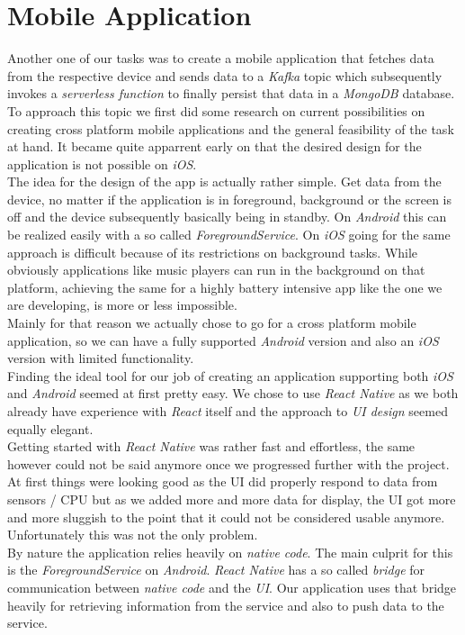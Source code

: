 \section{Mobile Application}

Another one of our tasks was to create a mobile application that fetches data from the respective device and sends data to a \textit{Kafka} topic which subsequently invokes a \textit{serverless function} to finally persist that data in a \textit{MongoDB} database. To approach this topic we first did some research on current possibilities on creating cross platform mobile applications and the general feasibility of the task at hand. It became quite apparrent early on that the desired design for the application is not possible on \textit{iOS}. \\
The idea for the design of the app is actually rather simple. Get data from the device, no matter if the application is in foreground, background or the screen is off and the device subsequently basically being in standby.
On \textit{Android} this can be realized easily with a so called \textit{ForegroundService}. On \textit{iOS} going for the same approach is difficult because of its restrictions on background tasks. While obviously applications like music players can run in the background on that platform, achieving the same for a highly battery intensive app like the one we are developing, is more or less impossible. \\
Mainly for that reason we actually chose to go for a cross platform mobile application, so we can have a fully supported \textit{Android} version and also an \textit{iOS} version with limited functionality. \\
Finding the ideal tool for our job of creating an application supporting both \textit{iOS} and \textit{Android} seemed at first pretty easy. We chose to use \textit{React Native} as we both already have experience with \textit{React} itself and the approach to \textit{UI design} seemed equally elegant. \\
Getting started with \textit{React Native} was rather fast and effortless, the same however could not be said anymore once we progressed further with the project. At first things were looking good as the UI did properly respond to data from sensors / CPU but as we added more and more data for display, the UI got more and more sluggish to the point that it could not be considered usable anymore. Unfortunately this was not the only problem. \\
By nature the application relies heavily on \textit{native code}. The main culprit for this is the \textit{ForegroundService} on \textit{Android}. \textit{React Native} has a so called \textit{bridge} for communication between \textit{native code} and the \textit{UI}. Our application uses that bridge heavily for retrieving information from the service and also to push data to the service. \\
